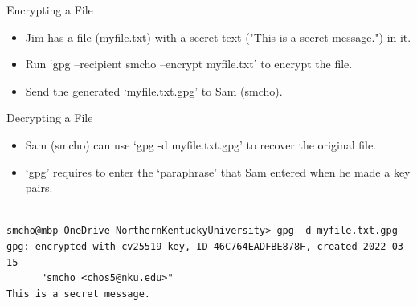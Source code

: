 \begin{frame}[fragile]{Encrypting a File}

\begin{itemize}
	\item Jim has a file (myfile.txt) with a secret text ("This is a secret message.") in it. 
	\item Run `gpg --recipient smcho --encrypt myfile.txt' to encrypt the file.
	\item Send the generated `myfile.txt.gpg' to Sam (smcho).
\end{itemize}

\end{frame}

\begin{frame}[fragile]{Decrypting a File}

\begin{itemize}
	\item Sam (smcho) can use `gpg -d myfile.txt.gpg' to recover the original file. 
	\item `gpg' requires to enter the `paraphrase' that Sam entered when he made a key pairs. 
\end{itemize}

\begin{Command}{}
\begin{lstlisting}[firstnumber=1, label=glabels, xleftmargin=0pt, basicstyle=\tiny]% 

smcho@mbp OneDrive-NorthernKentuckyUniversity> gpg -d myfile.txt.gpg
gpg: encrypted with cv25519 key, ID 46C764EADFBE878F, created 2022-03-15
      "smcho <chos5@nku.edu>"
This is a secret message.
\end{lstlisting}%
\end{Command}

\end{frame}